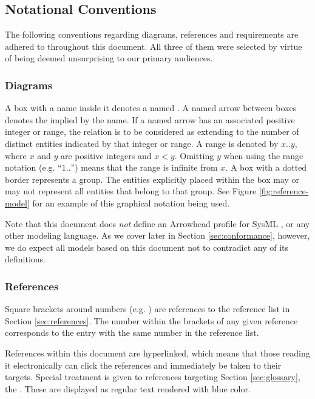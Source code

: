 \subsection{Notational Conventions}
\label{sec:introduction:conventions}

The following conventions regarding diagrams, references and requirements are adhered to throughout this document.
All three of them were selected by virtue of being deemed unsurprising to our primary audiences.

\subsubsection{Diagrams}

A box with a name inside it denotes a named .
A named arrow between boxes denotes the  implied by the name.
If a named arrow has an associated positive integer or range, the relation is to be considered as extending to the number of distinct entities indicated by that integer or range.
A range is denoted by $x..y$, where $x$ and $y$ are positive integers and $x<y$.
Omitting $y$ when using the range notation (e.g. ``$1..$'') means that the range is infinite from $x$.
A box with a dotted border represents a group.
The entities explicitly placed within the box may or may not represent all entities that belong to that group.
See Figure \ref{fig:reference-model} for an example of this graphical notation being used.

Note that this document does \textit{not} define an Arrowhead profile for SysML \cite{omg2019sysml}, or any other modeling language.
As we cover later in Section \ref{sec:conformance}, however, we do expect all models based on this document not to contradict any of its definitions.

\subsubsection{References}

Square brackets around numbers (e.g. \cite{delsing2017iot}) are references to the reference list in Section \ref{sec:references}.
The number within the brackets of any given reference corresponds to the entry with the same number in the reference list.

References within this document are hyperlinked, which means that those reading it electronically can click the references and immediately be taken to their targets.
Special treatment is given to references targeting Section \ref{sec:glossary}, the .
These are displayed as regular text rendered with blue color.

